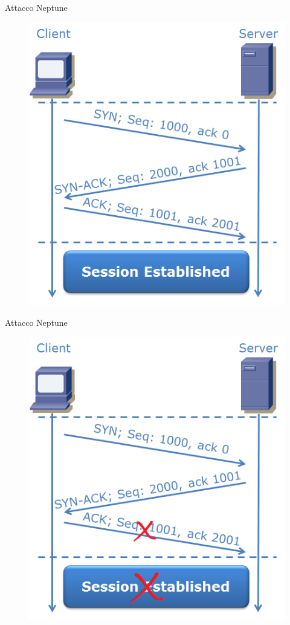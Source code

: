 \documentclass[xcolor={dvipsnames}]{beamer}
\begin{document}
		\begin{frame}{Attacco Neptune}
			\begin{figure}
				\begin{center}
					\includegraphics[width=.5\textwidth]{3wayh}
				\end{center}
			\end{figure}
		\end{frame}
	
		\begin{frame}{Attacco Neptune}
			\begin{figure}
				\begin{center}
					\includegraphics[width=.5\textwidth]{3wayh2}
				\end{center}
			\end{figure}
		\end{frame}
	
\end{document}
